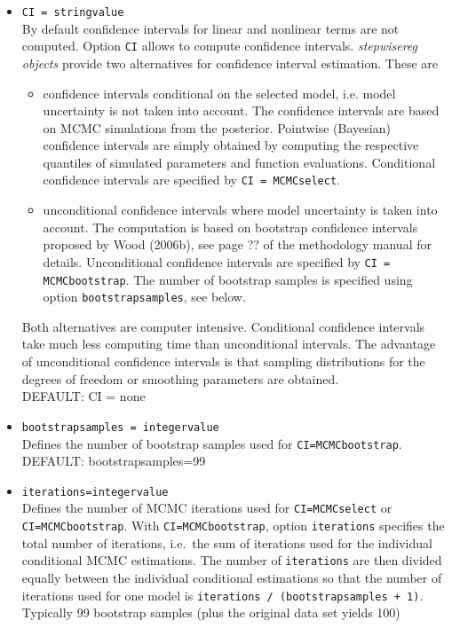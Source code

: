 \begin{itemize}
\item {\tt CI = stringvalue} \\
By default confidence intervals for linear and nonlinear terms are not computed. Option {\tt CI} allows to compute confidence intervals. {\em stepwisereg objects}
provide two alternatives for confidence interval estimation. These are
\begin{itemize}
\item confidence intervals conditional on the selected model, i.e. model uncertainty is not taken into account. The confidence intervals are
based on MCMC simulations from the posterior. Pointwise (Bayesian) confidence intervals are simply obtained by computing the respective
quantiles of simulated parameters and function evaluations. Conditional confidence intervals are specified by {\tt CI = MCMCselect}.
\item unconditional confidence intervals where model uncertainty is taken into account. The computation is based on bootstrap confidence intervals
proposed by Wood (2006b), see page ?? of the methodology manual for details. Unconditional confidence intervals are specified by {\tt CI = MCMCbootstrap}.
The number of bootstrap samples is specified using option {\tt bootstrapsamples}, see below.
\end{itemize}
Both alternatives are computer intensive. Conditional confidence intervals take much less computing time than unconditional intervals. The advantage of
unconditional confidence intervals is that sampling distributions for the degrees of freedom or smoothing parameters are obtained. \\
DEFAULT: CI = none
\item {\tt bootstrapsamples = integervalue} \\
Defines the number of bootstrap samples used for {\tt CI=MCMCbootstrap}. \\
DEFAULT: bootstrapsamples=99
\item {\tt iterations=integervalue} \\
 Defines the number of MCMC iterations used for {\tt CI=MCMCselect} or
{\tt CI=MCMCbootstrap}. With {\tt CI=MCMCbootstrap}, option {\tt iterations} specifies the total number
of iterations, i.e.~the sum of iterations used for the individual conditional MCMC estimations.
The number of  {\tt iterations} are then divided equally between the individual conditional estimations so that the number of iterations
used for one model is {\tt iterations / (bootstrapsamples + 1)}. Typically 99 bootstrap samples (plus the original data set yields 100)

\end{itemize}
